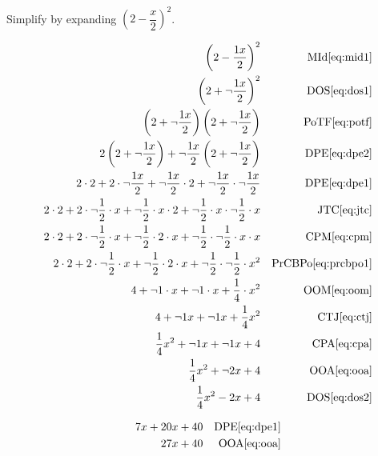 \documentclass[20150903-160354-rs2.2-MarksMathNotebook.tex]{subfiles}
\begin{document}
\begin{example}[id:20141105-161225]\label{20141105-161225}  \hfill \\

Simplify by expanding $\left(2-\dfrac{x}{2} \right)^2$.

\soln

\solnsteps
\begin{align*}
\left(2-\dfrac{1x}{2} \right)^2 && \text{MId} \eqref{eq:mid1} \\
\left(2+ \neg \dfrac{1x}{2} \right)^2 && \text{DOS} \eqref{eq:dos1} \\
\left(2+ \neg \dfrac{1x}{2} \right)\left(2+ \neg \dfrac{1x}{2} \right) && \text{PoTF} \eqref{eq:potf} \\
2\left(2+ \neg \dfrac{1x}{2} \right) + \neg \dfrac{1x}{2}\left(2+ \neg \dfrac{1x}{2} \right) && \text{DPE} \eqref{eq:dpe2} \\
2 \cdot 2 + 2 \cdot \neg \dfrac{1x}{2} + \neg \dfrac{1x}{2} \cdot 2 + \neg \dfrac{1x}{2} \cdot \neg \dfrac{1x}{2} && \text{DPE} \eqref{eq:dpe1} \\
2 \cdot 2 + 2 \cdot \neg \dfrac{1}{2} \cdot x + \neg \dfrac{1}{2} \cdot x \cdot 2 + \neg \dfrac{1}{2} \cdot x \cdot \neg \dfrac{1}{2} \cdot x && \text{JTC} \eqref{eq:jtc} \\
2 \cdot 2 + 2 \cdot \neg \dfrac{1}{2} \cdot x + \neg \dfrac{1}{2} \cdot 2 \cdot x + \neg \dfrac{1}{2} \cdot \neg \dfrac{1}{2} \cdot x \cdot x && \text{CPM} \eqref{eq:cpm} \\
2 \cdot 2 + 2 \cdot \neg \dfrac{1}{2} \cdot x + \neg \dfrac{1}{2} \cdot 2 \cdot x + \neg \dfrac{1}{2} \cdot \neg \dfrac{1}{2} \cdot x^2 && \text{PrCBPo} \eqref{eq:prcbpo1} \\
4 + \neg 1 \cdot x + \neg 1 \cdot x +  \dfrac{1}{4} \cdot x^2 && \text{OOM} \eqref{eq:oom} \\
4 + \neg 1 x + \neg 1 x +  \dfrac{1}{4} x^2 && \text{CTJ} \eqref{eq:ctj} \\
\dfrac{1}{4} x^2 + \neg 1 x + \neg 1 x + 4 && \text{CPA} \eqref{eq:cpa} \\
\dfrac{1}{4} x^2 + \neg 2 x + 4 && \text{OOA} \eqref{eq:ooa} \\
\dfrac{1}{4} x^2 - 2 x + 4 && \text{DOS} \eqref{eq:dos2}
\end{align*}

\soln

\lesssteps
\begin{align*}
7x + 20x + 40 && \text{DPE} \eqref{eq:dpe1} \\
27x + 40 && \text{OOA} \eqref{eq:ooa}
\end{align*}
\end{example}
\end{document}
